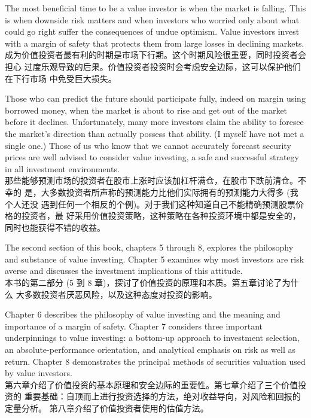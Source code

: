 \begin{verseparallel}
  {
    The most beneficial time to be a value investor is when the market is
    falling. This is when downside risk matters and when investors who worried
    only about what could go right suffer the consequences of undue optimism.
    Value investors invest with a margin of safety that protects them from large
    losses in declining markets. \\
  }
  {
    成为价值投资者最有利的时期是市场下行期。这个时期风险很重要，同时投资者会担心
    过度乐观导致的后果。价值投资者投资时会考虑安全边际，这可以保护他们在下行市场
    中免受巨大损失。
  }
\end{verseparallel}
\begin{verseparallel}
  {
    Those who can predict the future should participate fully, indeed on margin
    using borrowed money, when the market is about to rise and get out of the
    market before it declines. Unfortunately, many more investors claim the
    ability to foresee the market's direction than actually possess that
    ability. (I myself have not met a single one.) Those of us who know that we
    cannot accurately forecast security prices are well advised to consider
    value investing, a safe and successful strategy in all investment
    environments. \\
  }
  {
    那些能够预测市场的投资者在股市上涨时应该加杠杆满仓，在股市下跌前清仓。不幸的
    是，大多数投资者所声称的预测能力比他们实际拥有的预测能力大得多{} (我个人还没
    遇到任何一个相反的个例)。对于我们这种知道自己不能精确预测股票价格的投资者，最
    好采用价值投资策略，这种策略在各种投资环境中都是安全的，同时也能获得不错的收益。
  }
\end{verseparallel}
\begin{verseparallel}
  {
    The second section of this book, chapters 5 through 8, explores the
    philosophy and substance of value investing. Chapter 5 examines why most
    investors are risk averse and discusses the investment implications of this
    attitude. \\
  }
  {
    本书的第二部分{} (5 到 8 章)，探讨了价值投资的原理和本质。第五章讨论了为什么
    大多数投资者厌恶风险，以及这种态度对投资的影响。
  }
\end{verseparallel}
\begin{verseparallel}
  {
    Chapter 6 describes the philosophy of value investing and the meaning and
    importance of a margin of safety. Chapter 7 considers three important
    underpinnings to value investing: a bottom-up approach to investment
    selection, an absolute-performance orientation, and analytical emphasis on
    risk as well as return. Chapter 8 demonstrates the principal methods of
    securities valuation used by value investors. \\
  }
  {
    第六章介绍了价值投资的基本原理和安全边际的重要性。第七章介绍了三个价值投资的
    重要基础：自顶而上进行投资选择的方法，绝对收益导向，对风险和回报的定量分析。
    第八章介绍了价值投资者使用的估值方法。
  }
\end{verseparallel}
